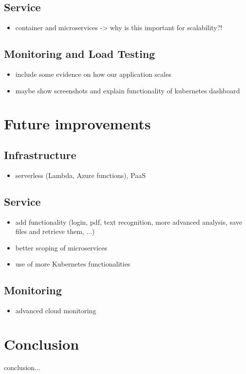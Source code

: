 \documentclass[conference]{IEEEtran}
\begin{document}
\subsection{Service}
\begin{itemize}
	\item container and microservices -> why is this important for scalability?!
\end{itemize}

\subsection{Monitoring and Load Testing}
\begin{itemize}
	\item include some evidence on how our application scales
	\item maybe show screenshots and explain functionality of kubernetes dashboard
\end{itemize}

\section{Future improvements}
\label{sec:future-improvments}
\subsection{Infrastructure}
\begin{itemize}
	\item serverless (Lambda, Azure functions),  PaaS
\end{itemize}

\subsection{Service}
\begin{itemize}
	\item add functionality (login, pdf, text recognition, more advanced analysis, save files and retrieve them, ...)
	\item better scoping of microservices
	\item use of more Kubernetes functionalities
\end{itemize}

\subsection{Monitoring}
\begin{itemize}
	\item advanced cloud monitoring
\end{itemize}

\section{Conclusion}
\label{sec:conclusion}
conclusion...




\end{document}
